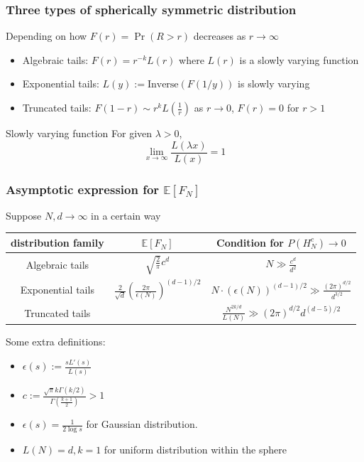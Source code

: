 \documentclass{beamer}
\def\E{\mathbb{E}}
\begin{document}
\begin{frame}
    \frametitle{Three types of spherically symmetric distribution}
    Depending on how $F(r)=\Pr(R>r)$ decreases as $r\to \infty$
    \begin{itemize}
        \item Algebraic tails: $F(r)= r^{-k} L(r)$ where $L(r)$ is a slowly varying function
        \item Exponential tails: $L(y):=\textrm{Inverse}(F(1/y))$ is slowly varying
        \item Truncated tails: $F(1-r) \sim r^k L(\frac{1}{r})$ as $r\to 0$, $F(r)=0$ for $r>1$
    \end{itemize}
    \begin{block}
    {Slowly varying function}
    For given $\lambda >0$,
     \begin{equation}
          \lim_{x\to \infty}  \frac{L(\lambda x)}{L(x)} = 1
        \end{equation}
    \end{block}
\end{frame}
\begin{frame}
    \frametitle{Asymptotic expression for $\E[F_N]$}
    Suppose $N,d \to \infty$ in a certain way
    \begin{table}
    \begin{tabular}{|c|c|c|}
        \hline
        distribution family & $\E[F_N]$ & Condition for $P(H_N^c) \to 0$ \\
        \hline
       Algebraic tails & $\sqrt{\frac{2}{\pi}}
       c^d$
       & $N\gg \frac{c^d}{d^2}$ \\
       \hline
       Exponential tails & $\frac{2}{\sqrt{d}} (\frac{2\pi}{\epsilon(N)})^{(d-1)/2}$
       & $ N\cdot                                                                    (\epsilon(N))^{(d-1)/2} \gg \frac{(2\pi)^{d/2}}{d^{3/2}}$ \\
       \hline
       Truncated tails & 
       & $\frac{N^{2k/d}}{L(N)}
       \gg (2\pi)^{d/2}d^{(d-5)/2}$\\
       \hline
    \end{tabular}
\end{table}
Some extra definitions:
\begin{itemize}
\item $\epsilon(s):=\frac{sL'(s)}{L(s)}$
\item $c:=\frac{\sqrt{\pi}k\Gamma(k/2)}{\Gamma(\frac{k+1}{2})}>1$
\item $\epsilon(s)=\frac{1}{2\log s}$ for Gaussian distribution.
\item $L(N)=d,k=1$ for uniform distribution within the sphere
\end{itemize}
\end{frame}
\end{document}
